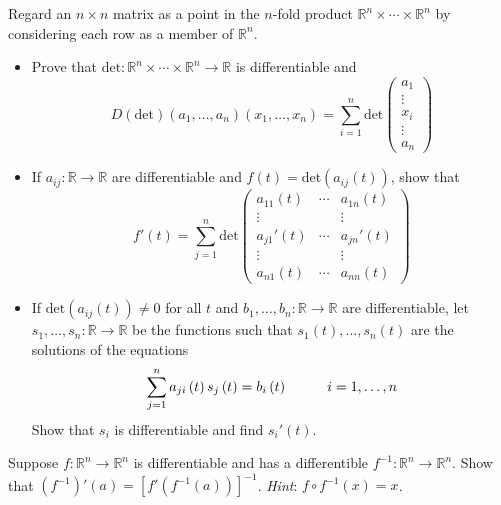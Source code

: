 \documentclass[12pt]{article}
\newenvironment{problem}[2][Problem]{\begin{trivlist}
\item[\hskip \labelsep {\bfseries #1}\hskip \labelsep {\bfseries #2.}]}{\end{trivlist}}
\begin{document}
\begin{problem}{2.15}
Regard an $n\times n$ matrix as a point in the $n$-fold product $\mathbb{R}^n \times \cdots \times \mathbb{R}^n$ by considering each row as a member of $\mathbb{R}^n$.
\begin{itemize}
	\item Prove that $\text{det}:\mathbb{R}^n \times \cdots \times \mathbb{R}^n \rightarrow \mathbb{R}$ is differentiable and
	$$ D\left(\text{det}\right) \left(a_1,\ldots,a_n\right)\left(x_1,\ldots,x_n\right) = \sum_{i=1}^n \text{det} \left( \begin{array}{c} a_1 \\ \vdots \\ x_i \\ \vdots \\ a_n \end{array} \right) $$
	\item If $a_{ij}:\mathbb{R}\rightarrow \mathbb{R}$ are differentiable and $f\left(t\right) = \text{det}\left(a_{ij}\left(t\right)\right)$, show that
	$$ f'\left(t\right) = \sum_{j=1}^n \text{det} \left( \begin{array}{ccc} a_{11}\left(t\right) & \cdots & a_{1n}\left(t\right) \\
	\vdots & & \vdots  \\
	a_{j1}'\left(t\right) & \cdots & a_{jn}'\left(t\right) \\
	\vdots & & \vdots \\
	a_{n1}\left(t\right) & \cdots & a_{nn}\left(t\right)
	\end{array}\right) $$
	\item If $\text{det}\left(a_{ij}\left(t\right)\right) \neq 0$ for all $t$ and $b_1,\ldots,b_n:\mathbb{R}\rightarrow \mathbb{R}$ are differentiable, let $s_1,\ldots,s_n:\mathbb{R}\rightarrow \mathbb{R}$ be the functions such that $s_1\left(t\right),\ldots,s_n\left(t\right)$ are the solutions of the equations
	$$ \sum_{j=1}^n a_{ji}\left(t\right)s_j\left(t\right) = b_i\left(t\right) \hspace{10mm} i=1,\ldots,n$$ Show that $s_i$ is differentiable and find $s_i'\left(t\right)$.
\end{itemize}
\end{problem}


\begin{problem}{2.16}
Suppose $f:\mathbb{R}^n \rightarrow \mathbb{R}^n$ is differentiable and has a differentible $f^{-1}: \mathbb{R}^n \rightarrow \mathbb{R}^n$. Show that $\left(f^{-1}\right)'\left(a\right) = \left[f'\left(f^{-1}\left(a\right)\right)\right]^{-1}$. \textit{Hint}: $f \circ f^{-1}\left(x\right) = x$. 
\end{problem}
\end{document}
